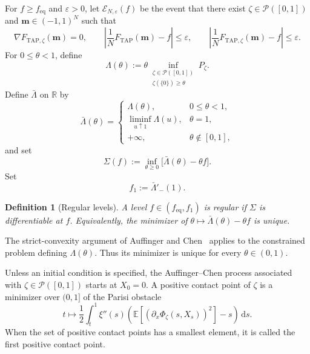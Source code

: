 \documentclass[a4paper,10pt,reqno]{amsart}
\numberwithin{equation}{section}
\newtheorem{definition}[proposition]{Definition}%
\newcommand{\ve}{\varepsilon}
\newcommand{\dE}{\mathbb{E}}%
\newcommand{\mc}{\mathcal}
\newcommand{\dd}{\mathrm{d}}
\newcommand{\TAP}{\mathrm{TAP}}
\newcommand{\eq}{\mathrm{eq}}
\newcommand{\bfm}{\mathbf{m}}
\begin{document}
	For \(f\ge f_{\eq}\) and \(\ve>0\), let \(\mc E_{N,\ve}(f)\) be the
	event that there exist \(\zeta\in\mc P([0,1])\) and
	\(\bfm\in(-1,1)^N\) such that
	\[
	\nabla F_{\TAP,\zeta}(\bfm)=0,
	\qquad
	\left|\frac1N F_{\TAP}(\bfm)-f\right|\le\ve,
	\qquad
	\left|\frac1N F_{\TAP,\zeta}(\bfm)-f\right|\le\ve.
	\]
	For \(0\le\theta<1\), define
	\[
	\Lambda(\theta)
	:=
	\theta
	\inf_{\substack{\zeta\in\mc P([0,1])\\
			\zeta(\{0\})\ge\theta}}
	P_\zeta.
	\]
	Define \(\bar\Lambda\) on \(\mathbb R\) by
	\[
	\bar\Lambda(\theta)
	=
	\begin{cases}
		\Lambda(\theta), & 0\le\theta<1,\\
		\displaystyle\liminf_{u\uparrow1}\Lambda(u), & \theta=1,\\
		+\infty, & \theta\notin[0,1],
	\end{cases}
	\]
	and set
	\[
	\Sigma(f)
	:=
	\inf_{\theta\ge0}
	\bigl[\bar\Lambda(\theta)-\theta f\bigr].
	\]
	Set
	\[
	f_1:=\bar\Lambda'_-(1).
	\]
	
	\begin{definition}[Regular levels]
		\label{def:regular-levels}
		A level \(f\in(f_{\eq},f_1)\) is regular if \(\Sigma\) is
		differentiable at \(f\). Equivalently, the minimizer of
		\(\theta\mapsto\bar\Lambda(\theta)-\theta f\) is unique.
	\end{definition}
	
	The strict-convexity argument of Auffinger and
	Chen~\cite[Theorem~2]{AuffingerChen} applies to the constrained problem
	defining \(\Lambda(\theta)\). Thus its minimizer is unique for every
	\(\theta\in(0,1)\).
	
	Unless an initial condition is specified, the Auffinger--Chen process
	associated with \(\zeta\in\mc P([0,1])\) starts at \(X_0=0\). A positive
	contact point of \(\zeta\) is a minimizer over \((0,1]\) of the Parisi
	obstacle
	\[
	t\longmapsto
	\frac12\int_t^1\xi''(s)
	\left(
	\dE\left[
	\left(\partial_x\Phi_\zeta(s,X_s)\right)^2
	\right]-s
	\right)\,\dd s.
	\]
	When the set of positive contact points has a smallest element, it is
	called the first positive contact point.
	
\end{document}
